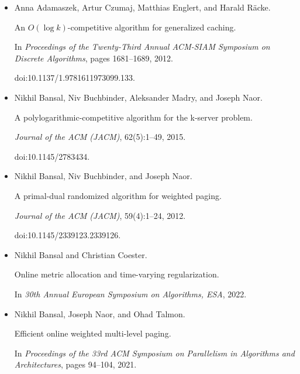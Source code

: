 \documentclass[10pt,a4paper]{article}
\begin{document}
\begin{itemize}


\item[] 
[1]

Anna Adamaszek, Artur Czumaj, Matthias Englert, and Harald Räcke.


An $O(\log k)$-competitive algorithm for generalized caching.


In \emph{Proceedings of the Twenty-Third Annual ACM-SIAM Symposium on
Discrete Algorithms}, pages 1681–1689, 2012.


doi:10.1137/1.9781611973099.133.





\item[] 
[2]

Nikhil Bansal, Niv Buchbinder, Aleksander Madry, and Joseph Naor.


A polylogarithmic-competitive algorithm for the k-server problem.


\emph{Journal of the ACM (JACM)}, 62(5):1–49, 2015.


doi:10.1145/2783434.





\item[] 
[3]

Nikhil Bansal, Niv Buchbinder, and Joseph Naor.


A primal-dual randomized algorithm for weighted paging.


\emph{Journal of the ACM (JACM)}, 59(4):1–24, 2012.


doi:10.1145/2339123.2339126.





\item[] 
[4]

Nikhil Bansal and Christian Coester.


Online metric allocation and time-varying regularization.


In \emph{30th Annual European Symposium on Algorithms, ESA}, 2022.





\item[] 
[5]

Nikhil Bansal, Joseph Naor, and Ohad Talmon.


Efficient online weighted multi-level paging.


In \emph{Proceedings of the 33rd ACM Symposium on Parallelism in
Algorithms and Architectures}, pages 94–104, 2021.






\end{itemize}
\end{document}
